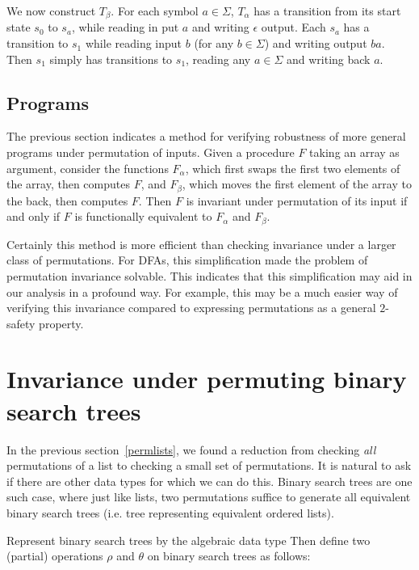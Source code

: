 \documentclass{llncs}
\begin{document}
We now construct $T_\beta$.
For each symbol $a \in \Sigma$,
$T_\alpha$ has a transition from its start
state $s_0$ to $s_a$, while reading in put $a$ and
writing $\epsilon$ output.
Each $s_a$ has a transition to $s_1$ while
reading input $b$ (for any $b\in \Sigma$)
and writing output $ba$.
Then $s_1$ simply has transitions to $s_1$,
reading any $a\in \Sigma$ and writing
back $a$.

\subsection{Programs}
The previous section indicates a method for verifying
robustness of more general programs under permutation of inputs.
Given a procedure $F$ taking an array as argument, consider the functions $F_\alpha$, which first swaps the first two elements of the array, then computes $F$, and $F_\beta$, which moves the first element of the array to the back, then computes $F$. Then $F$ is invariant under permutation of its input if and only if $F$ is functionally equivalent to $F_\alpha$ and $F_\beta$.

Certainly this method is more efficient than checking invariance under a larger class of permutations. For DFAs, this simplification made the problem of permutation invariance solvable. This indicates that this simplification may aid in our analysis in a profound way. For example, this may be a much easier way of verifying this invariance compared to expressing permutations as a general $2$-safety property.

\section{Invariance under permuting binary search trees}

In the previous section~\ref{permlists}, we found a reduction
from checking \emph{all} permutations of a list to checking a small set of
permutations. It is natural to ask if there are other data types for which we
can do this. Binary search trees are one such case, where just like lists,
two permutations suffice to generate all equivalent binary search trees
(i.e. tree representing equivalent ordered lists).

Represent binary search trees by the algebraic data type
Then define two (partial) operations $\rho$ and $\theta$ on binary search trees
as follows:
\end{document}
